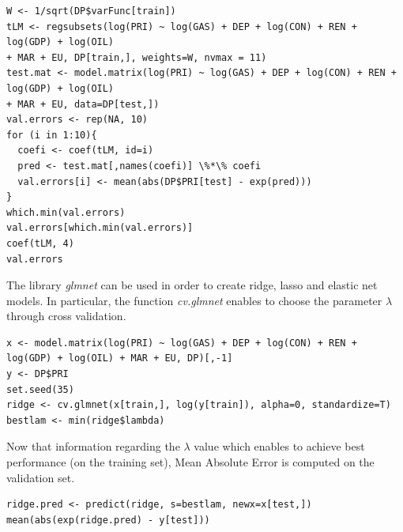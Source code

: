\documentclass{book}
\begin{document}
\begin{verbatim}
W <- 1/sqrt(DP$varFunc[train])
tLM <- regsubsets(log(PRI) ~ log(GAS) + DEP + log(CON) + REN + log(GDP) + log(OIL)
+ MAR + EU, DP[train,], weights=W, nvmax = 11)
test.mat <- model.matrix(log(PRI) ~ log(GAS) + DEP + log(CON) + REN + log(GDP) + log(OIL)
+ MAR + EU, data=DP[test,])
val.errors <- rep(NA, 10)
for (i in 1:10){
  coefi <- coef(tLM, id=i)
  pred <- test.mat[,names(coefi)] \%*\% coefi
  val.errors[i] <- mean(abs(DP$PRI[test] - exp(pred)))
}
which.min(val.errors)
val.errors[which.min(val.errors)]
coef(tLM, 4)
val.errors
\end{verbatim}

The library \textit{glmnet} can be used in order to create ridge, lasso and elastic net models. In particular, the function \textit{cv.glmnet} enables to choose the parameter $\lambda$ through cross validation. 

\begin{verbatim}
x <- model.matrix(log(PRI) ~ log(GAS) + DEP + log(CON) + REN + log(GDP) + log(OIL) + MAR + EU, DP)[,-1]
y <- DP$PRI
set.seed(35)
ridge <- cv.glmnet(x[train,], log(y[train]), alpha=0, standardize=T)
bestlam <- min(ridge$lambda)
\end{verbatim}

Now that information regarding the $\lambda$ value which enables to achieve best performance (on the training set), Mean Absolute Error is computed on the validation set.

\begin{verbatim}
ridge.pred <- predict(ridge, s=bestlam, newx=x[test,])
mean(abs(exp(ridge.pred) - y[test]))
\end{verbatim}

{}

\end{document}
